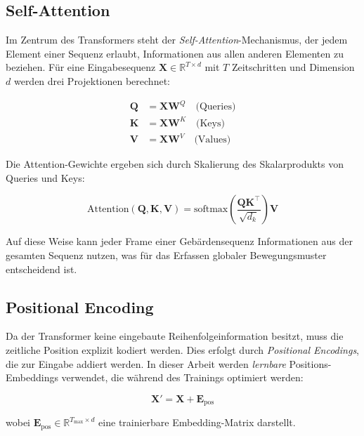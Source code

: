\subsection{Self-Attention}

Im Zentrum des Transformers steht der \textit{Self-Attention}-Mechanismus, der jedem Element einer Sequenz erlaubt, Informationen aus allen anderen Elementen zu beziehen. Für eine Eingabesequenz $\mathbf{X} \in \mathbb{R}^{T \times d}$ mit $T$ Zeitschritten und Dimension $d$ werden drei Projektionen berechnet:

\begin{align}
    \mathbf{Q} &= \mathbf{X} \mathbf{W}^Q \quad \text{(Queries)} \\
    \mathbf{K} &= \mathbf{X} \mathbf{W}^K \quad \text{(Keys)} \\
    \mathbf{V} &= \mathbf{X} \mathbf{W}^V \quad \text{(Values)}
\end{align}

Die Attention-Gewichte ergeben sich durch Skalierung des Skalarprodukts von Queries und Keys:

\begin{equation}
    \text{Attention}(\mathbf{Q}, \mathbf{K}, \mathbf{V}) = \text{softmax}\left(\frac{\mathbf{Q}\mathbf{K}^\top}{\sqrt{d_k}}\right) \mathbf{V}
\end{equation}

Auf diese Weise kann jeder Frame einer Gebärdensequenz Informationen aus der gesamten Sequenz nutzen, was für das Erfassen globaler Bewegungsmuster entscheidend ist.

\subsection{Positional Encoding}

Da der Transformer keine eingebaute Reihenfolgeinformation besitzt, muss die zeitliche Position explizit kodiert werden. Dies erfolgt durch \textit{Positional Encodings}, die zur Eingabe addiert werden. In dieser Arbeit werden \textit{lernbare} Positions-Embeddings verwendet, die während des Trainings optimiert werden:

\begin{equation}
    \mathbf{X}' = \mathbf{X} + \mathbf{E}_{\text{pos}}
\end{equation}

wobei $\mathbf{E}_{\text{pos}} \in \mathbb{R}^{T_{\max} \times d}$ eine trainierbare Embedding-Matrix darstellt.


